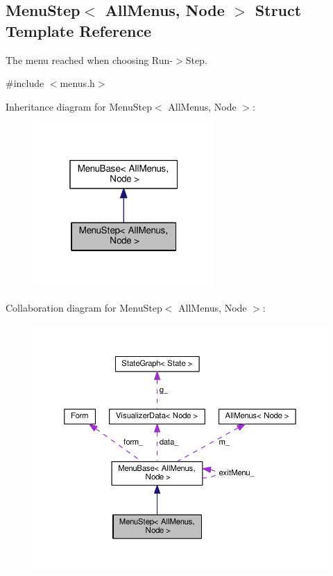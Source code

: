 \hypertarget{structMenuStep}{}\subsection{Menu\+Step$<$ All\+Menus, Node $>$ Struct Template Reference}
\label{structMenuStep}


The menu reached when choosing Run-\/$>$Step.  




{\ttfamily \#include $<$menus.\+h$>$}



Inheritance diagram for Menu\+Step$<$ All\+Menus, Node $>$\+:\nopagebreak
\begin{figure}[H]
\begin{center}
\leavevmode
\includegraphics[width=196pt]{structMenuStep__inherit__graph}
\end{center}
\end{figure}


Collaboration diagram for Menu\+Step$<$ All\+Menus, Node $>$\+:\nopagebreak
\begin{figure}[H]
\begin{center}
\leavevmode
\includegraphics[width=350pt]{structMenuStep__coll__graph}
\end{center}
\end{figure}
